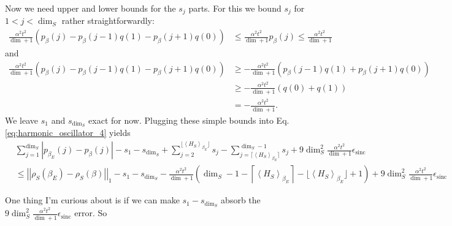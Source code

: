 \documentclass{article}
\newcommand{\parens}[1]{\left( #1 \right)}
\newcommand{\norm}[1]{\left| \left| #1 \right| \right|}
\newcommand{\anglebrackets}[1]{\left< #1 \right>}
\newcommand{\ceil}[1]{\left\lceil #1 \right\rceil}
\DeclareMathOperator{\sinc}{sinc}
\begin{document}
Now we need upper and lower bounds for the $s_j$ parts. For this we bound $s_j$ for $1 < j < \dim_S$ rather straightforwardly:
\begin{align}
    \frac{\alpha^2 t^2}{\dim + 1} \parens{p_{\beta}(j) - p_{\beta}(j-1) q(1) - p_{\beta}(j+1) q(0)} &\leq \frac{\alpha^2 t^2}{\dim + 1} p_{\beta} (j) \leq \frac{\alpha^2 t^2}{\dim + 1}
\end{align}
and
\begin{align}
    \frac{\alpha^2 t^2}{\dim + 1} \parens{p_{\beta}(j) - p_{\beta}(j-1) q(1) - p_{\beta}(j+1) q(0)} &\geq - \frac{\alpha^2 t^2}{\dim + 1} (p_{\beta}(j-1) q(1) + p_{\beta}(j+1) q(0) ) \\
    &\geq - \frac{\alpha^2 t^2}{\dim + 1} (q(0) + q(1)) \\
    &= - \frac{\alpha^2 t^2}{\dim + 1}.
\end{align}
We leave $s_1$ and $s_{\dim_S}$ exact for now.
Plugging these simple bounds into Eq. \eqref{eq:harmonic_oscillator_4} yields
\begin{align}
    &\sum_{j=1}^{\dim_S} |p_{\beta_E}(j) - p_{\beta}(j)| - s_1 - s_{\dim_S} + \sum_{j = 2}^{\lfloor \anglebrackets{H_S}_{\beta_E} \rfloor} s_j - \sum_{j = \lceil \anglebrackets{H_S}_{\beta_E} \rceil}^{\dim_S - 1} s_j + 9 \dim_S^2 \frac{\alpha^2 t^2}{\dim + 1} \epsilon_{\sinc} \\
    &\leq \norm{\rho_S(\beta_E) - \rho_S(\beta)}_1 - s_1 - s_{\dim_S} - \frac{\alpha^2 t^2}{\dim + 1} \parens{\dim_S - 1 - \ceil{\anglebrackets{H_S}_{\beta_E}} - \lfloor \anglebrackets{H_S}_{\beta_E} \rfloor + 1} + 9 \dim_S^2 \frac{\alpha^2 t^2}{\dim + 1} \epsilon_{\sinc}
\end{align}

One thing I'm curious about is if we can make $s_1 - s_{\dim_S}$ absorb the  $9 \dim_S^2 \frac{\alpha^2 t^2}{\dim + 1} \epsilon_{\sinc}$ error. So 
  
\end{document}

